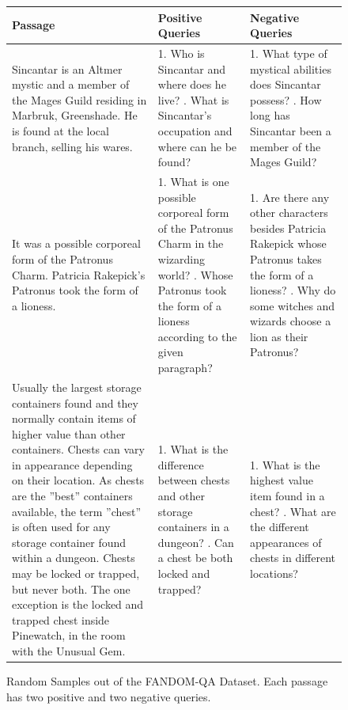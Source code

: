 \documentclass[11pt]{article}
\begin{document}
\begin{figure}[ht]
    \centering
    \caption{Random Samples out of the FANDOM-QA Dataset. Each passage has two positive and two negative queries.}
    \label{tab:fandom-qa}
    \begin{tabular}{|p{4.5cm}|p{4.5cm}|p{4.5cm}|}
        \hline
        \textbf{Passage} & \textbf{Positive Queries} & \textbf{Negative Queries} \\
        \hline
        Sincantar is an Altmer mystic and a member of the Mages Guild residing in Marbruk, Greenshade. He is found at the local branch, selling his wares. &
        1. Who is Sincantar and where does he live? \linebreak \linebreak 2. What is Sincantar's occupation and where can he be found?&
        1. What type of mystical abilities does Sincantar possess? \linebreak \linebreak 2. How long has Sincantar been a member of the Mages Guild?\\
        \hline
        [Lions in the wizarding world] It was a possible corporeal form of the Patronus Charm. Patricia Rakepick's Patronus took the form of a lioness. &
        1. What is one possible corporeal form of the Patronus Charm in the wizarding world? \linebreak \linebreak 2. Whose Patronus took the form of a lioness according to the given paragraph?&
        1. Are there any other characters besides Patricia Rakepick whose Patronus takes the form of a lioness? \linebreak \linebreak 2. Why do some witches and wizards choose a lion as their Patronus?\\
        \hline
        [Chest] Usually the largest storage containers found and they normally contain items of higher value than other containers. Chests can vary in appearance depending on their location. As chests are the ''best'' containers available, the term ''chest'' is often used for any storage container found within a dungeon. Chests may be locked or trapped, but never both. The one exception is the locked and trapped chest inside Pinewatch, in the room with the Unusual Gem. &
        1. What is the difference between chests and other storage containers in a dungeon? \linebreak \linebreak 2. Can a chest be both locked and trapped? &
        1. What is the highest value item found in a chest?  \linebreak \linebreak 2. What are the different appearances of chests in different locations?\\
        \hline
    \end{tabular}
\end{figure}
\end{document}
